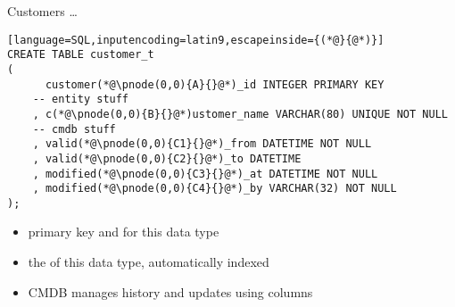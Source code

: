 \documentclass[ngerman,xcolor={table,dvipsnames},smaller,compress,hyperref={bookmarks,colorlinks}]{beamer}%
\begin{document}
\begin{frame}[fragile]{}
\begin{block}{Customers \ldots}
\scriptsize
\begin{lstlisting}[language=SQL,inputencoding=latin9,escapeinside={(*@}{@*)}]
CREATE TABLE customer_t
(
      customer(*@\pnode(0,0){A}{}@*)_id INTEGER PRIMARY KEY
    -- entity stuff
    , c(*@\pnode(0,0){B}{}@*)ustomer_name VARCHAR(80) UNIQUE NOT NULL
    -- cmdb stuff
    , valid(*@\pnode(0,0){C1}{}@*)_from DATETIME NOT NULL
    , valid(*@\pnode(0,0){C2}{}@*)_to DATETIME
    , modified(*@\pnode(0,0){C3}{}@*)_at DATETIME NOT NULL
    , modified(*@\pnode(0,0){C4}{}@*)_by VARCHAR(32) NOT NULL
);
\end{lstlisting}
\end{block}

\begin{itemize}
\item<2-> primary key and  for this data type
\item<3-> the  of this data type, automatically indexed
\item<4-> CMDB manages history and updates using  columns
\end{itemize}
\end{frame}
\end{document}
